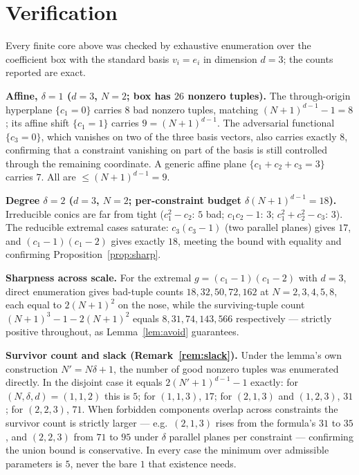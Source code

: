 \documentclass[11pt]{article}
\theoremstyle{definition}
\begin{document}
\section{Verification}\label{sec:verify}

Every finite core above was checked by exhaustive enumeration over the coefficient box
with the standard basis $v_i = e_i$ in dimension $d = 3$; the counts reported are exact.

\medskip
\noindent\textbf{Affine, $\delta = 1$ ($d=3$, $N=2$; box has $26$ nonzero tuples).}
The through-origin hyperplane $\{c_1 = 0\}$ carries $8$ bad nonzero tuples, matching
$(N+1)^{d-1} - 1 = 8$; its affine shift $\{c_1 = 1\}$ carries $9 = (N+1)^{d-1}$. The
adversarial functional $\{c_3 = 0\}$, which vanishes on two of the three basis vectors,
also carries exactly $8$, confirming that a constraint vanishing on part of the basis is
still controlled through the remaining coordinate. A generic affine plane
$\{c_1 + c_2 + c_3 = 3\}$ carries $7$. All are $\le (N+1)^{d-1} = 9$.

\medskip
\noindent\textbf{Degree $\delta = 2$ ($d=3$, $N=2$; per-constraint budget
$\delta(N+1)^{d-1} = 18$).} Irreducible conics are far from tight
($c_1^2 - c_2$: $5$ bad; $c_1 c_2 - 1$: $3$; $c_1^2 + c_2^2 - c_3$: $3$). The reducible
extremal cases saturate: $c_3(c_3 - 1)$ (two parallel planes) gives $17$, and
$(c_1 - 1)(c_1 - 2)$ gives exactly $18$, meeting the bound with equality and confirming
Proposition~\ref{prop:sharp}.

\medskip
\noindent\textbf{Sharpness across scale.} For the extremal $g = (c_1-1)(c_1-2)$ with
$d = 3$, direct enumeration gives bad-tuple counts $18, 32, 50, 72, 162$ at
$N = 2,3,4,5,8$, each equal to $2(N+1)^2$ on the nose, while the surviving-tuple count
$(N+1)^3 - 1 - 2(N+1)^2$ equals $8, 31, 74, 143, 566$ respectively --- strictly positive
throughout, as Lemma~\ref{lem:avoid} guarantees.

\medskip
\noindent\textbf{Survivor count and slack (Remark~\ref{rem:slack}).} Under the
lemma's own construction $N' = N\delta + 1$, the number of good nonzero tuples was
enumerated directly. In the disjoint case it equals $2(N'+1)^{d-1} - 1$ exactly:
for $(N,\delta,d) = (1,1,2)$ this is $5$; for $(1,1,3)$, $17$; for $(2,1,3)$ and
$(1,2,3)$, $31$; for $(2,2,3)$, $71$. When forbidden components overlap across
constraints the survivor count is strictly larger --- e.g.\ $(2,1,3)$ rises from the
formula's $31$ to $35$, and $(2,2,3)$ from $71$ to $95$ under $\delta$ parallel planes
per constraint --- confirming the union bound is conservative. In every case the
minimum over admissible parameters is $5$, never the bare $1$ that existence needs.
\end{document}
